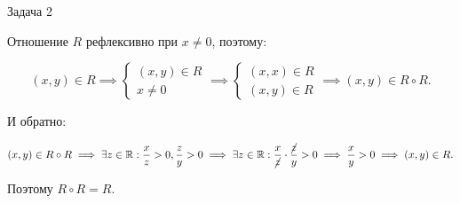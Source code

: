 \documentclass{article}
\newcommand{\R}{\mathbb{R}}
\begin{document}
	\begin{section}{Задача 2}

		Отношение $R$ рефлексивно при $x \ne 0$, поэтому:

		\begin{equation*}
			(x, y) \in R
			\implies
			\begin{cases}
				(x, y) \in R \\
				x \ne 0
			\end{cases}
			\implies
			\begin{cases}
				(x, x) \in R \\
				(x, y) \in R
			\end{cases}
			\implies
			(x, y) \in R \circ R.
		\end{equation*}

		И обратно:

		\begin{equation*}
			(x, y) \in R \circ R
			\implies
			\exists z \in \R: \frac{x}{z} > 0, \frac{z}{y} > 0
			\implies
			\exists z \in \R: \frac{x}{\cancel{z}} \cdot \frac{\cancel{z}}{y} > 0
			\implies
			\frac{x}{y} > 0
			\implies
			(x, y) \in R.
		\end{equation*}

		Поэтому $R \circ R = R$.
	\end{section}
\end{document}
